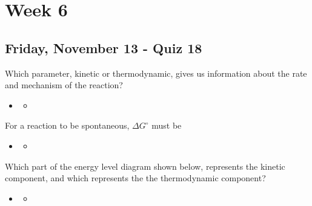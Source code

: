 \documentclass[12pt,a4paper]{article}
\begin{document}
\tableofcontents
\cleardoublepage
\fancyhead{}
\clearpage
\section*{Week 6}
{}

\subsection{Friday, November 13 - Quiz 18}
\begin{enumerate}
    {\color{G-Moon}\item Which parameter, kinetic or thermodynamic, gives us information about the rate and mechanism of the reaction?}
        \begin{itemize}
            \item {\color{o-Sun}\textbf{}} 
            \begin{itemize}
                \item 
            \end{itemize}
        \end{itemize}
    {\color{G-Moon}\item For a reaction to be spontaneous, \(\Delta G^\circ\) must be}
        \begin{itemize}
            \item {\color{o-Sun}\textbf{}} 
            \begin{itemize}
                \item 
            \end{itemize}
        \end{itemize}
    {\color{G-Moon}\item Which part of the energy level diagram shown below, represents the kinetic component, and which represents the the thermodynamic component? }
        \begin{itemize}
            \item {\color{o-Sun}\textbf{}} 
            \begin{itemize}
                \item 
            \end{itemize}
        \end{itemize}

\end{enumerate}
\end{document}
